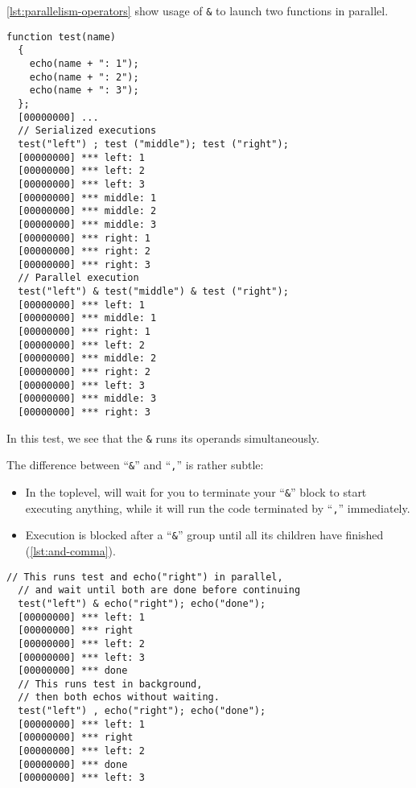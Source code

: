 \documentclass[openright,twoside,12pt]{report}
\begin{document}
\autoref{lst:parallelism-operators} show usage of \texttt{\&} to launch two
functions in parallel.

\begin{lstlisting}[caption=Parallelism operator,
  label=lst:parallelism-operators]
  function test(name)
  {
    echo(name + ": 1");
    echo(name + ": 2");
    echo(name + ": 3");
  };
  [00000000] ...
  // Serialized executions
  test("left") ; test ("middle"); test ("right");
  [00000000] *** left: 1
  [00000000] *** left: 2
  [00000000] *** left: 3
  [00000000] *** middle: 1
  [00000000] *** middle: 2
  [00000000] *** middle: 3
  [00000000] *** right: 1
  [00000000] *** right: 2
  [00000000] *** right: 3
  // Parallel execution
  test("left") & test("middle") & test ("right");
  [00000000] *** left: 1
  [00000000] *** middle: 1
  [00000000] *** right: 1
  [00000000] *** left: 2
  [00000000] *** middle: 2
  [00000000] *** right: 2
  [00000000] *** left: 3
  [00000000] *** middle: 3
  [00000000] *** right: 3
\end{lstlisting}

In this test, we see that the \texttt{\&} runs its operands
simultaneously.

The difference between ``\texttt{\&}'' and ``\texttt{,}'' is rather
subtle:

\begin{itemize}
\item In the toplevel, will wait for you to terminate your
  ``\texttt{\&}'' block to start executing anything, while it will run
  the code terminated by ``\texttt{,}'' immediately.
\item Execution is blocked after a ``\texttt{\&}'' group until all its
  children have finished (\autoref{lst:and-comma}).
\end{itemize}

\begin{lstlisting}[caption=Difference between ``\texttt{\&}'' and
  ``\texttt{,}'', label=lst:and-comma]
  // This runs test and echo("right") in parallel,
  // and wait until both are done before continuing
  test("left") & echo("right"); echo("done");
  [00000000] *** left: 1
  [00000000] *** right
  [00000000] *** left: 2
  [00000000] *** left: 3
  [00000000] *** done
  // This runs test in background,
  // then both echos without waiting.
  test("left") , echo("right"); echo("done");
  [00000000] *** left: 1
  [00000000] *** right
  [00000000] *** left: 2
  [00000000] *** done
  [00000000] *** left: 3
\end{lstlisting}
\end{document}
